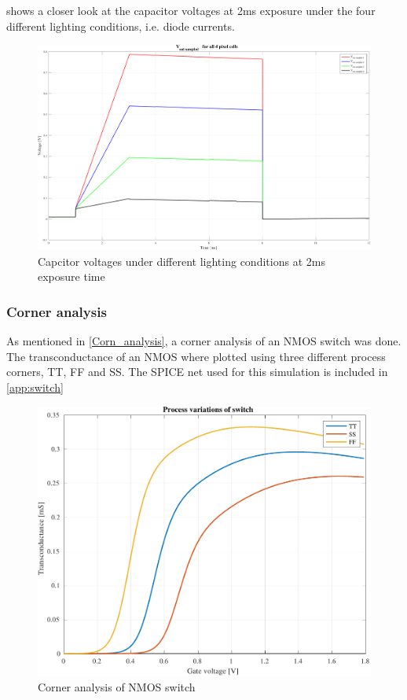  shows a closer look at the capacitor voltages at 2ms exposure under the four different lighting conditions, i.e. diode currents.

\begin{figure}[H]
    \centering
    \includegraphics[width=\textwidth]{Images/Analog_plots/v_out_sampled_all_2ms.pdf}
    \caption{Capcitor voltages under different lighting conditions at 2ms exposure time}
    \label{fig:res:anal:all3}
\end{figure}


\subsubsection{Corner analysis}
As mentioned in \cref{Corn_analysis}, a corner analysis of an NMOS switch was done. 
The transconductance of an NMOS where plotted using three different process corners, TT, FF and SS. 
The SPICE net used for this simulation is included in \cref{app:switch}

\begin{figure}[H]
    \centering
    \includegraphics[width=\textwidth]{Images/Analog_plots/corneranalysis.pdf}
    \caption{Corner analysis of NMOS switch}
    \label{fig:res:anal:corn_nmos}
\end{figure}


